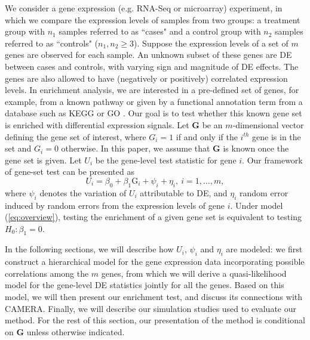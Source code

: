 	We consider a gene expression (e.g. RNA-Seq or microarray) experiment, in which we compare the 
	expression levels of samples from two groups: a treatment group with $n_1$ samples referred to 
	as ``cases" and a control group with $n_2$ samples referred to as ``controls" ($n_1,n_2\ge 3$). 
	Suppose the expression levels of a set of $m$ genes are observed for each sample. An unknown 
	subset of these genes are DE between cases and controls, with varying sign and magnitude of DE 
	effects. The genes are also allowed to have (negatively or positively) correlated expression 
	levels. In enrichment analysis, we are interested in a pre-defined set of genes, for example, 
	from a known pathway or given by a functional annotation term from a database such as KEGG
	\citep{kanehisa2000kegg} or GO \citep{ashburner2000gene}. Our goal is to test whether this known
	gene set is enriched with differential expression signals. Let $\bm G$ be an $m$-dimensional 
	vector defining the gene set of interest, where $G_i=1$ if and only if the $i^{th}$ gene is in 
	the set and $G_i=0$ otherwise. In this paper, we assume that $\bm G$ is known once the gene set 
	is given. Let $U_i$ be the gene-level test statistic for gene $i$. 
	Our framework of gene-set test can be presented as 
		\begin{equation}\label{eq:overview}
		U_i = \beta_0 + \beta_1\text{G}_i  + \psi_i  + \eta_i, ~i = 1, \ldots, m,  
		\end{equation}
	where $\psi_i$ denotes the variation of $U_i$ attributable to DE, and $\eta_i$ random error 
	induced by random errors from the expression levels of gene $i$. Under model 
	(\ref{eq:overview}), testing the enrichment 
	of a given gene set is equivalent to testing $H_0:\beta_1 = 0$. 
		
	 In the following sections, we will describe how $U_i$, $\psi_i$ and $\eta_i$ are modeled: we 
	 first construct a hierarchical model for the gene expression data incorporating possible 
	 correlations among the 
	$m$ genes, from which we will derive a quasi-likelihood model for the gene-level DE statistics 
	jointly for all the genes. Based on this model, we will then present our enrichment test, and 
	discuss its connections with CAMERA. Finally, we will describe our simulation studies used to 
	evaluate our method. For the rest of this section, our presentation of the method is 
	conditional on $\bm G$ unless otherwise indicated.
	
	\subsubsection{\OurMethod}
